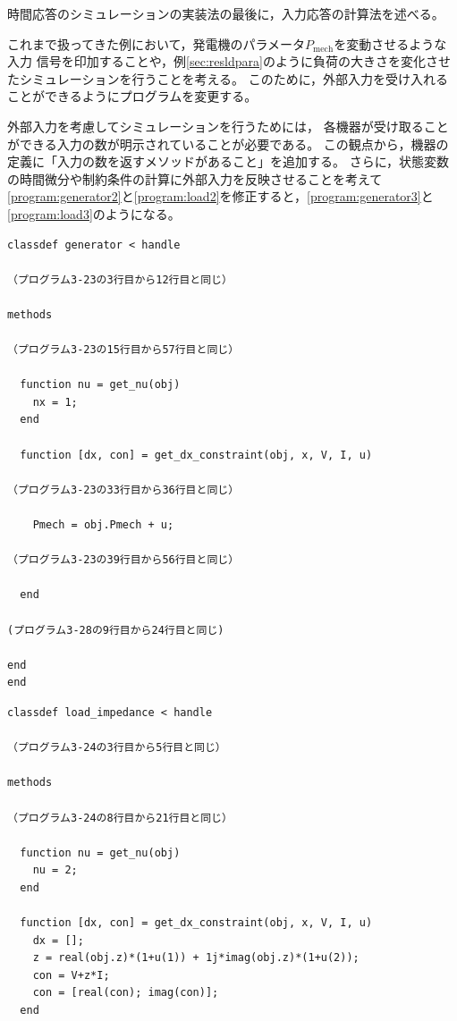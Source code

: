 \documentclass[tombow,dvipdfmx]{corona-a5-1.1}
\begin{document}
時間応答のシミュレーションの実装法の最後に，入力応答の計算法を述べる。
\begin{例}
これまで扱ってきた例において，発電機のパラメータ$P_\mathrm{mech}$を変動させるような入力
信号を印加することや，例\ref{sec:resldpara}のように負荷の大きさを変化させたシミュレーションを行うことを考える。
このために，外部入力を受け入れることができるようにプログラムを変更する。

外部入力を考慮してシミュレーションを行うためには，
各機器が受け取ることができる入力の数が明示されていることが必要である。
この観点から，機器の定義に「入力の数を返すメソッドがあること」を追加する。
さらに，状態変数の時間微分や制約条件の計算に外部入力を反映させることを考えて
\ref{program:generator2}と\ref{program:load2}を修正すると，\ref{program:generator3}と\ref{program:load3}のようになる。
\begin{PROGRAMA}[count,title={generator.m}]\label{program:generator3}
  \begin{verbatim}
classdef generator < handle
  
（プログラム3-23の3行目から12行目と同じ）

methods

（プログラム3-23の15行目から57行目と同じ）

  function nu = get_nu(obj)
    nx = 1;
  end

  function [dx, con] = get_dx_constraint(obj, x, V, I, u)
    
（プログラム3-23の33行目から36行目と同じ）

    Pmech = obj.Pmech + u;

（プログラム3-23の39行目から56行目と同じ）

  end

(プログラム3-28の9行目から24行目と同じ)

end
end
\end{verbatim}
\end{PROGRAMA}

\begin{PROGRAMA}[count,title={load\_impedance.m}]\label{program:load3}
\begin{verbatim}
classdef load_impedance < handle
  
（プログラム3-24の3行目から5行目と同じ）

methods

（プログラム3-24の8行目から21行目と同じ）
  
  function nu = get_nu(obj)
    nu = 2;
  end

  function [dx, con] = get_dx_constraint(obj, x, V, I, u)
    dx = [];
    z = real(obj.z)*(1+u(1)) + 1j*imag(obj.z)*(1+u(2));
    con = V+z*I;
    con = [real(con); imag(con)];
  end


\end{verbatim}
\end{PROGRAMA}
\end{例}
\end{document}
